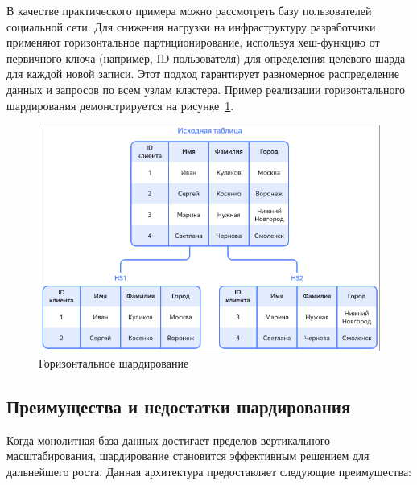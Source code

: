 \begin{itemize}
    В качестве практического примера можно рассмотреть базу пользователей
    социальной сети. Для снижения нагрузки на инфраструктуру разработчики
    применяют горизонтальное партиционирование, используя хеш-функцию от
    первичного ключа (например, ID пользователя) для определения целевого шарда
    для каждой новой записи. Этот подход гарантирует равномерное распределение
    данных и запросов по всем узлам кластера. Пример реализации горизонтального
    шардирования демонстрируется на рисунке~\ref{fig:fig02}.

\begin{figure}
  \centering
  \includegraphics[scale=0.5]{inc/horizontal-sharding.png}
  \caption{Горизонтальное шардирование}
  \label{fig:fig02}
\end{figure}
\end{itemize}

\subsection{Преимущества и недостатки шардирования}

Когда монолитная база данных достигает пределов вертикального масштабирования,
шардирование становится эффективным решением для дальнейшего роста. Данная
архитектура предоставляет следующие преимущества:

